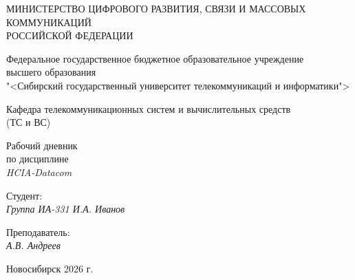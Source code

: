 \thispagestyle{empty}

\begin{center}
    МИНИСТЕРСТВО ЦИФРОВОГО РАЗВИТИЯ, СВЯЗИ И МАССОВЫХ КОММУНИКАЦИЙ \\ РОССИЙСКОЙ ФЕДЕРАЦИИ
    
    \vspace{20pt}
    
    Федеральное государственное бюджетное образовательное учреждение  \\  высшего образования \\
    "<Сибирский государственный университет телекоммуникаций и информатики"> \\
    
    \vspace{20pt}
    
    Кафедра телекоммуникационных систем и вычислительных средств \\  (ТС и ВС)
\end{center}

\vfill

\begin{center}
    Рабочий дневник  \\  
    по дисциплине \\
    \textit{HCIA-Datacom}
    \vspace{20pt}
\end{center}

\vfill

    \noindent Студент: \\
    \textit{Группа ИА-331 \hfill И.А. Иванов}
    
    \vspace{20pt}

    \vspace{20pt}
    
    \noindent Преподаватель: \\
    \textit{\hfill А.В. Андреев}
    
\vfill

\begin{center}
    Новосибирск 2026 г.
\end{center}